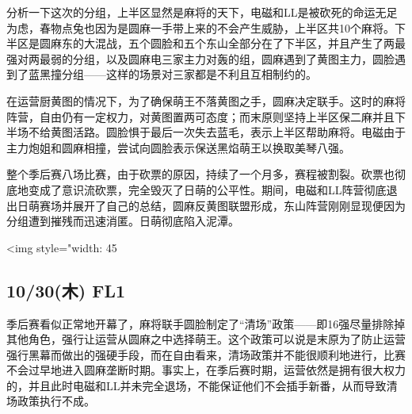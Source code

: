 分析一下这次的分组，上半区显然是麻将的天下，电磁和LL是被砍死的命运无足为虑，春物点兔也因为是圆麻一手带上来的不会产生威胁，上半区共10个麻将。下半区是圆麻东的大混战，五个圆脸和五个东山全部分在了下半区，并且产生了两最强对两最弱的分组，以及圆麻电三家主力对轰的组，圆麻遇到了黄图主力，圆脸遇到了蓝黑撞分组——这样的场景对三家都是不利且互相制约的。

在运营厨黄图的情况下，为了确保萌王不落黄图之手，圆麻决定联手。这时的麻将阵营，自由仍有一定权力，对黄图置两可态度；而末原则坚持上半区保二麻并且下半场不给黄图活路。圆脸惧于最后一次失去蓝毛，表示上半区帮助麻将。电磁由于主力炮姐和圆麻相撞，尝试向圆脸表示保送黑焰萌王以换取美琴八强。

整个季后赛八场比赛，由于砍票的原因，持续了一个月多，赛程被割裂。砍票也彻底地变成了意识流砍票，完全毁灭了日萌的公平性。期间，电磁和LL阵营彻底退出日萌赛场并展开了自己的总结，圆麻反黄图联盟形成，东山阵营刚刚显现便因为分组遭到摧残而迅速消匿。日萌彻底陷入泥潭。

<img style="width: 45%

\subsection{10/30(木) FL1}


季后赛看似正常地开幕了，麻将联手圆脸制定了“清场”政策——即16强尽量排除掉其他角色，强行让运营从圆麻之中选择萌王。这个政策可以说是末原为了防止运营强行黑幕而做出的强硬手段，而在自由看来，清场政策并不能很顺利地进行，比赛不会过早地进入圆麻垄断时期。事实上，在季后赛时期，运营依然是拥有很大权力的，并且此时电磁和LL并未完全退场，不能保证他们不会插手新番，从而导致清场政策执行不成。

